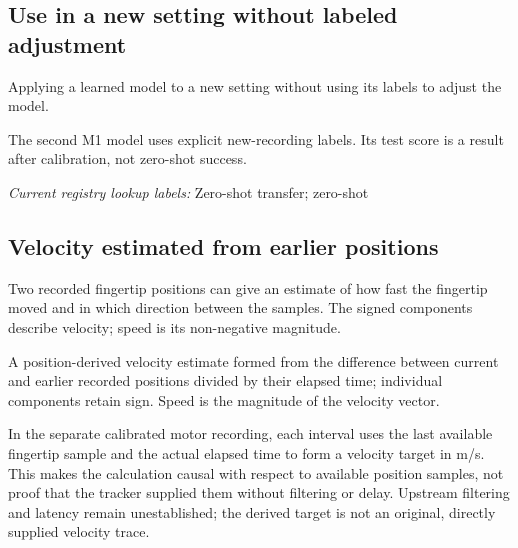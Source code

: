 \begin{samepage}
\subsection*{Use in a new setting without labeled adjustment}
\noindent Applying a learned model to a new setting without using its labels to adjust the model.\par
\end{samepage}
\begin{samepage}
\noindent The second M1 model uses explicit new-recording labels. Its test score is a result after calibration, not zero-shot success.\par\nopagebreak[4]

\end{samepage}


\noindent\textit{Current registry lookup labels:} Zero-shot transfer; zero-shot\par

\begin{samepage}
\subsection*{Velocity estimated from earlier positions}
\noindent Two recorded fingertip positions can give an estimate of how fast the fingertip moved and in which direction between the samples. The signed components describe velocity; speed is its non-negative magnitude.\par
\end{samepage}
\noindent A position-derived velocity estimate formed from the difference between current and earlier recorded positions divided by their elapsed time; individual components retain sign. Speed is the magnitude of the velocity vector.\par
\begin{samepage}
\noindent In the separate calibrated motor recording, each interval uses the last available fingertip sample and the actual elapsed time to form a velocity target in m/s. This makes the calculation causal with respect to available position samples, not proof that the tracker supplied them without filtering or delay. Upstream filtering and latency remain unestablished; the derived target is not an original, directly supplied velocity trace.\par\nopagebreak[4]

\end{samepage}


